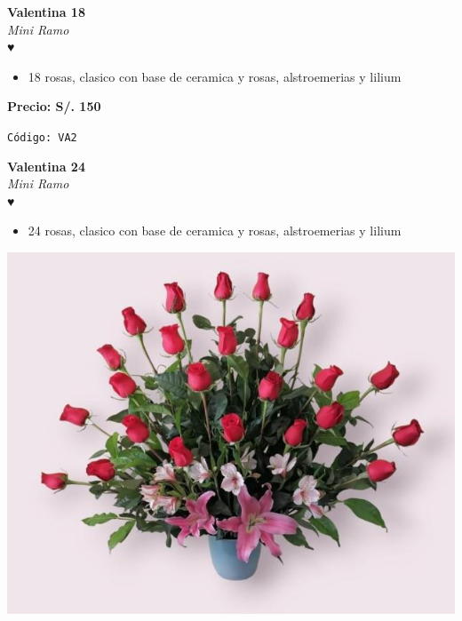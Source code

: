 \documentclass[12pt]{article}
\begin{document}
\hspace{1cm}
\begin{minipage}{0.6\textwidth}
    \textcolor[HTML]{FF8C00}{\textbf{\huge Valentina 18 }}\\
    {\textit{Mini Ramo}} \\
    \textcolor[HTML]{FF8C00}{\Huge ♥} \\
    \vspace{0.5cm}
    \begin{itemize}
        \item 18 rosas, clasico con base de ceramica y rosas, alstroemerias y lilium
    \end{itemize}
\end{minipage}
\vspace{0.3cm}
\begin{center}
   \textbf{\Large Precio: \textcolor[HTML]{228B22}{S/. 150 }}
\end{center}
\begin{center}
    \textcolor[HTML]{191970}{\texttt{Código: VA2}}
\end{center}
\vspace{1cm}
\noindent
\begin{minipage}{0.6\textwidth}
    \textcolor[HTML]{FF8C00}{\textbf{\huge Valentina 24 }}\\
    {\textit{Mini Ramo}} \\
    \textcolor[HTML]{FF8C00}{\Huge ♥} \\
    \vspace{0.5cm}
    \begin{itemize}
        \item 24 rosas, clasico con base de ceramica y rosas, alstroemerias y lilium
    \end{itemize}
\end{minipage}
\hspace{1cm}
\begin{minipage}{0.35\textwidth}
    \includegraphics[width=1.0\textwidth]{imagenes_extraidas/image_10_5}
\end{minipage}
\end{document}
